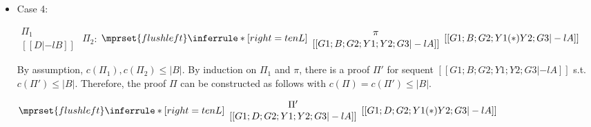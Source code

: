 \begin{itemize}
\item Case 4:
      \begin{center}
        \scriptsize
        \begin{math}
          \begin{array}{c}
            \Pi_1 \\
            {[[D |-l B]]}
          \end{array}
        \end{math}
        \qquad\qquad
        $\Pi_2$:
        \begin{math}
          $$\mprset{flushleft}
          \inferrule* [right={\tiny tenL}] {
            {
              \begin{array}{c}
                \pi \\
                {[[G1; B; G2; Y1; Y2; G3 |-l A]]}
              \end{array}
            }
          }{[[G1; B; G2; Y1 (*) Y2; G3 |-l A]]}
        \end{math}
      \end{center}
      By assumption, $c(\Pi_1),c(\Pi_2)\leq |B|$. By induction on $\Pi_1$
      and $\pi$, there is a proof $\Pi'$ for sequent
      $[[G1; B; G2; Y1; Y2; G3 |-l A]]$ s.t. $c(\Pi') \leq |B|$. Therefore,
      the proof $\Pi$ can be constructed as follows with
      $c(\Pi) = c(\Pi') \leq |B|$.
      \begin{center}
        \scriptsize
        \begin{math}
          $$\mprset{flushleft}
          \inferrule* [right={\tiny tenL}] {
            {
              \begin{array}{c}
                \Pi' \\
                {[[G1; D; G2; Y1; Y2; G3 |-l A]]}
              \end{array}
            }
          }{[[G1; D; G2; Y1 (*) Y2; G3 |-l A]]}
        \end{math}
      \end{center}


\end{itemize}
